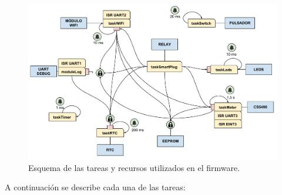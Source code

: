 \begin{figure}[h]
	\centering
	\includegraphics[width=14cm]{./Figures/3_2_1_firmware_esquema_tareas.pdf}
	\caption{Esquema de las tareas y recursos utilizados en el firmware.}
	\label{fig:firmware_esquema_tareas}
\end{figure}

A continuación se describe cada una de las tareas:

